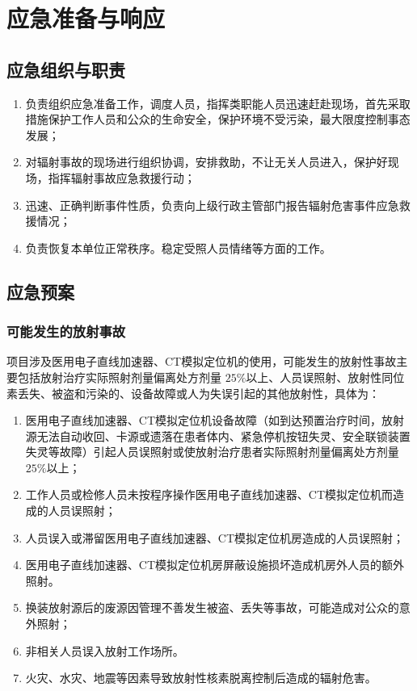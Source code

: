 \chapter{应急准备与响应}

\section{应急组织与职责}


\begin{enumerate}
\item 负责组织应急准备工作，调度人员，指挥类职能人员迅速赶赴现场，首先采取措施保护工作人员和公众的生命安全，保护环境不受污染，最大限度控制事态发展；
\item 对辐射事故的现场进行组织协调，安排救助，不让无关人员进入，保护好现场，指挥辐射事故应急救援行动；
\item 迅速、正确判断事件性质，负责向上级行政主管部门报告辐射危害事件应急救援情况；
\item 负责恢复本单位正常秩序。稳定受照人员情绪等方面的工作。
\end{enumerate}

\section{应急预案}

\subsection{可能发生的放射事故}

项目涉及医用电子直线加速器、CT模拟定位机的使用，可能发生的放射性事故主要包括放射治疗实际照射剂量偏离处方剂量 $2 5 \%$以上、人员误照射、放射性同位素丢失、被盗和污染的、设备故障或人为失误引起的其他放射性，具体为：

\begin{enumerate}
\item 医用电子直线加速器、CT模拟定位机设备故障（如到达预置治疗时间，放射源无法自动收回、卡源或遗落在患者体内、紧急停机按钮失灵、安全联锁装置失灵等故障）引起人员误照射或使放射治疗患者实际照射剂量偏离处方剂量 $2 5 \%$以上；
\item 工作人员或检修人员未按程序操作医用电子直线加速器、CT模拟定位机而造成的人员误照射；
\item 人员误入或滞留医用电子直线加速器、CT模拟定位机房造成的人员误照射；
\item 医用电子直线加速器、CT模拟定位机房屏蔽设施损坏造成机房外人员的额外照射。
\item 换装放射源后的废源因管理不善发生被盗、丢失等事故，可能造成对公众的意外照射；
\item 非相关人员误入放射工作场所。
\item 火灾、水灾、地震等因素导致放射性核素脱离控制后造成的辐射危害。
\end{enumerate}

